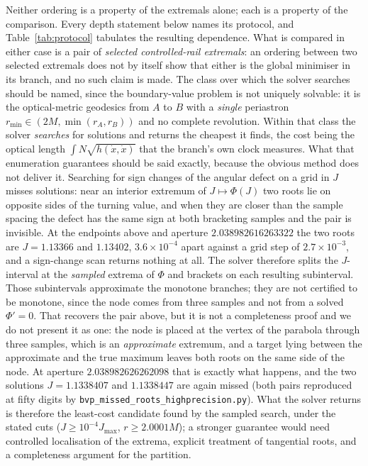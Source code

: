 \documentclass[12pt]{iopart}
\theoremstyle{plain}
\theoremstyle{definition}
\theoremstyle{remark}
\begin{document}
Neither ordering is a property of the extremals alone; each is a property of the
comparison. Every depth statement below names its protocol, and
Table~\ref{tab:protocol} tabulates the resulting dependence. What is compared in
either case is a pair of \emph{selected controlled-rail extremals}: an ordering
between two selected extremals does not by itself show that either is the global
minimiser in its branch, and no such claim is made. The class over which the
solver searches should be named, since the boundary-value problem is not
uniquely solvable: it is the optical-metric geodesics from $A$ to $B$ with a
\emph{single} periastron $r_{\min}\in(2M,\min(r_A,r_B))$ and no complete
revolution. Within that class the solver \emph{searches} for solutions and returns
the cheapest it finds, the cost being the optical length $\int N\sqrt{h(\dot x,\dot x)}$ that
the branch's own clock measures. What that enumeration guarantees should be said
exactly, because the obvious method does not deliver it. Searching for sign
changes of the angular defect on a grid in $J$ misses solutions: near an interior
extremum of $J\mapsto\Phi(J)$ two roots lie on opposite sides of the turning
value, and when they are closer than the sample spacing the defect has the same
sign at both bracketing samples and the pair is invisible. At the endpoints above
and aperture $2.038982616263322$ the two roots are $J=1.13366$ and $1.13402$,
$3.6\times10^{-4}$ apart against a grid step of $2.7\times10^{-3}$, and a
sign-change scan returns nothing at all. The solver therefore splits the
$J$-interval at the \emph{sampled} extrema of $\Phi$ and brackets on each
resulting subinterval. Those subintervals approximate the monotone branches; they
are not certified to be monotone, since the node comes from three samples and not
from a solved $\Phi'=0$. That recovers the
pair above, but it is not a completeness proof and we do not present it as one:
the node is placed at the vertex of the parabola through three samples, which is
an \emph{approximate} extremum, and a target lying between the approximate and
the true maximum leaves both roots on the same side of the node. At aperture
$2.038982626262098$ that is exactly what happens, and the two solutions
$J=1.1338407$ and $1.1338447$ are again missed (both pairs reproduced at fifty
digits by \texttt{bvp\_missed\_roots\_highprecision.py}). What the solver returns is
therefore the least-cost candidate found by the sampled search, under the stated
cuts ($J\ge10^{-4}J_{\max}$, $r\ge2.0001M$); a stronger guarantee would need
controlled localisation of the extrema, explicit treatment of tangential roots,
and a completeness argument for the partition.
\end{document}
